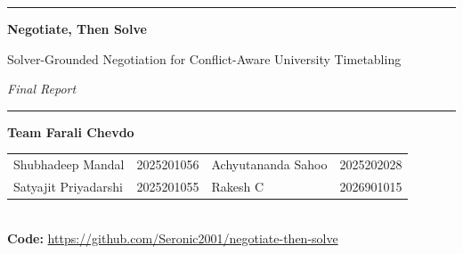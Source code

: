 \documentclass[11pt,a4paper]{article}
\begin{document}
\begin{center}
{\color{secblue}\rule{\textwidth}{0.8pt}}\par\vspace{2pt}
{\Large\bfseries Negotiate, Then Solve\par}
\vspace{2pt}
{\large Solver-Grounded Negotiation for Conflict-Aware University Timetabling\par}
\vspace{1pt}
{\normalsize\itshape Final Report\par}
\vspace{2pt}
{\color{secblue}\rule{\textwidth}{0.8pt}}\par
\vspace{3pt}
{\small\textbf{Team Farali Chevdo}\\[2pt]
\begin{tabular}{@{}l@{\;\;}l@{\qquad}l@{\;\;}l@{}}
Shubhadeep Mandal & 2025201056 & Achyutananda Sahoo & 2025202028\\
Satyajit Priyadarshi & 2025201055 & Rakesh C & 2026901015\\
\end{tabular}\\[3pt]
\textbf{Code:} \url{https://github.com/Seronic2001/negotiate-then-solve}\par}
\end{center}
\end{document}
